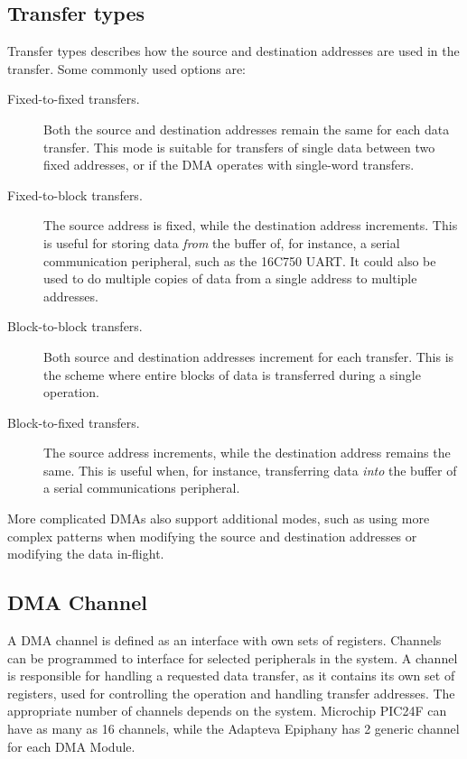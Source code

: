 \subsection{Transfer types}
Transfer types \cite{microchip54} describes how the source and destination addresses are used in the transfer.
Some commonly used options are:
\begin{description}
    \item[Fixed-to-fixed transfers.]
    Both the source and destination addresses remain the same for each data transfer.
    This mode is suitable for transfers of single data between two fixed addresses,
    or if the DMA operates with single-word transfers.
    \item[Fixed-to-block transfers.]
    The source address is fixed, while the destination address increments.
    This is useful for storing data \emph{from} the buffer of, for instance, a serial
    communication peripheral, such as the 16C750 UART.
    It could also be used to do multiple copies of data from a single address to multiple addresses.
    \item[Block-to-block transfers.]
    Both source and destination addresses increment for each transfer.
    This is the scheme where entire blocks of data is transferred during a single operation.
    \item[Block-to-fixed transfers.]
    The source address increments, while the destination address remains the same.
    This is useful when, for instance, transferring data \emph{into} the buffer of a
    serial communications peripheral.
\end{description}

More complicated DMAs also support  additional modes, such as using more complex patterns
when modifying the source and destination addresses or modifying the data in-flight.

\subsection{DMA Channel}
A DMA channel is defined \cite[p.~422]{DMAOxford} as an interface with own sets of registers.
Channels can be programmed to interface for selected peripherals in the system.
A channel is responsible for handling a requested data transfer, as it contains its own set of registers, used for controlling the operation and handling transfer addresses.
The appropriate number of channels depends on the system.
Microchip PIC24F \cite{microchip54} can have as many as 16 channels, while the Adapteva Epiphany \cite{epiphany} has 2 generic channel for each DMA Module.

